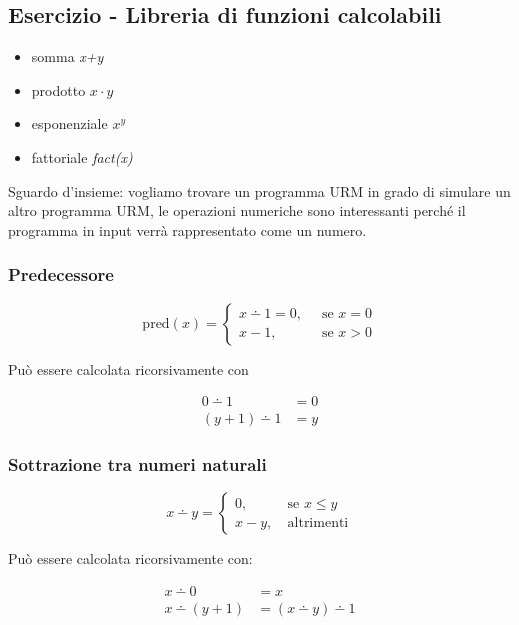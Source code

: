 
\subsection{Esercizio - Libreria di funzioni calcolabili}\label{esercizio---libreria-di-funzioni-calcolabili}

\begin{itemize}
\item
  somma \emph{x+y}
\item
  prodotto $x \cdot y$
\item
  esponenziale $x^y$
\item
  fattoriale \emph{fact(x)}
\end{itemize}

Sguardo d'insieme: vogliamo trovare un programma URM in grado di
simulare un altro programma URM, le operazioni numeriche sono
interessanti perché il programma in input verrà rappresentato come un
numero.

\subsubsection{Predecessore}\label{predecessore}

$$ \text{pred}(x) = \begin{cases}x \dotminus 1 = 0, \:& \text{ se } x=0\\
x-1, \:& \text{ se } x > 0\end{cases}$$

Può essere calcolata ricorsivamente con

\begin{align*}
	0 \dotminus 1 &= 0 \\
	(y+1) \dotminus 1 &= y
\end{align*}

\subsubsection{Sottrazione tra numeri naturali}\label{sottrazione-tra-numeri-naturali}

$$x \dotminus y =\begin{cases}
0,\:& \text{se } x \leq y\\
x-y, \:& \text{altrimenti}
\end{cases}$$

Può essere calcolata ricorsivamente con:

\begin{align*}
x \dotminus 0 &= x \\
x\dotminus (y+1) &= (x \dotminus y) \dotminus 1
\end{align*}

